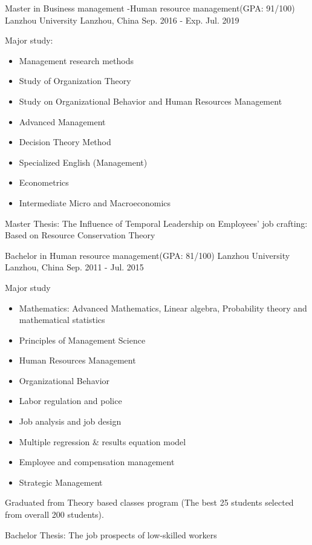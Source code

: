 \begin{cventries}
  \cventry
    {Master in Business management -Human resource management(GPA: 91/100)}
    {Lanzhou University}
    {Lanzhou, China}
    {Sep. 2016 - Exp. Jul. 2019}
    {
      \begin{cvitems}
        \item {
            Major study:
            \begin{itemize}
                \item Management research methods
		\item Study of Organization Theory
		\item Study on Organizational Behavior and Human Resources Management
                \item Advanced Management
		\item Decision Theory Method
		\item Specialized English (Management)
		\item Econometrics
		\item Intermediate Micro and Macroeconomics
	    \end{itemize}
        }
        \item {Master Thesis: The Influence of Temporal Leadership on Employees' job crafting: Based on Resource Conservation Theory}
      \end{cvitems}
    }
    \cventry
    {Bachelor in Human resource management(GPA: 81/100)}
    {Lanzhou University}
    {Lanzhou, China}
    {Sep. 2011 - Jul. 2015}
    {
      \begin{cvitems}
        \item {
            Major study
            \begin{itemize}
		\item Mathematics: Advanced Mathematics, Linear algebra, Probability theory and mathematical statistics 
		\item Principles of Management Science
                \item Human Resources Management
                \item Organizational Behavior
		\item Labor regulation and police
		\item Job analysis and job design
		\item Multiple regression \& results equation model
		\item Employee and compensation management
                \item Strategic Management            
	    \end{itemize}
        }
        \item {Graduated from Theory based classes program (The best 25 students selected from overall 200 students).}
        \item {Bachelor Thesis: The job prospects of low-skilled workers}
      \end{cvitems}
    }
\end{cventries}
